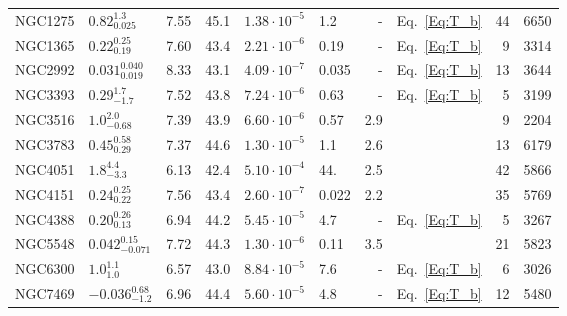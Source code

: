 \begin{footnotesize}
\begin{longtable}{llrrllrlrr}
NGC1275                &     $ 0.82_{0.025}^{1.3} $ &          7.55 &    45.1 & $1.38\cdot10^{-5}$ &          1.2 &        - &                    Eq.~\ref{Eq:T_b} &    44 &     6650 \\
NGC1365                &     $ 0.22_{0.19}^{0.25} $ &          7.60 &    43.4 & $2.21\cdot10^{-6}$ &         0.19 &        - &                    Eq.~\ref{Eq:T_b} &     9 &     3314 \\
NGC2992                &  $ 0.031_{0.019}^{0.040} $ &          8.33 &    43.1 & $4.09\cdot10^{-7}$ &        0.035 &        - &                    Eq.~\ref{Eq:T_b} &    13 &     3644 \\
NGC3393                &      $ 0.29_{-1.7}^{1.7} $ &          7.52 &    43.8 & $7.24\cdot10^{-6}$ &         0.63 &        - &                    Eq.~\ref{Eq:T_b} &     5 &     3199 \\
NGC3516                &      $ 1.0_{-0.68}^{2.0} $ &          7.39 &    43.9 & $6.60\cdot10^{-6}$ &         0.57 &      2.9 &            {\citet{summons_thesis}} &     9 &     2204 \\
NGC3783                &     $ 0.45_{0.29}^{0.58} $ &          7.37 &    44.6 & $1.30\cdot10^{-5}$ &          1.1 &      2.6 &            {\citet{summons_thesis}} &    13 &     6179 \\
NGC4051                &       $ 1.8_{-3.3}^{4.4} $ &          6.13 &    42.4 & $5.10\cdot10^{-4}$ &          44. &      2.5 &            {\citet{summons_thesis}} &    42 &     5866 \\
NGC4151                &     $ 0.24_{0.22}^{0.25} $ &          7.56 &    43.4 & $2.60\cdot10^{-7}$ &        0.022 &      2.2 &            {\citet{summons_thesis}} &    35 &     5769 \\
NGC4388                &     $ 0.20_{0.13}^{0.26} $ &          6.94 &    44.2 & $5.45\cdot10^{-5}$ &          4.7 &        - &                    Eq.~\ref{Eq:T_b} &     5 &     3267 \\
NGC5548                &  $ 0.042_{-0.071}^{0.15} $ &          7.72 &    44.3 & $1.30\cdot10^{-6}$ &         0.11 &      3.5 &            {\citet{summons_thesis}} &    21 &     5823 \\
NGC6300                &        $ 1.0_{1.0}^{1.1} $ &          6.57 &    43.0 & $8.84\cdot10^{-5}$ &          7.6 &        - &                    Eq.~\ref{Eq:T_b} &     6 &     3026 \\
NGC7469                &   $ -0.036_{-1.2}^{0.68} $ &          6.96 &    44.4 & $5.60\cdot10^{-5}$ &          4.8 &        - &                    Eq.~\ref{Eq:T_b} &    12 &     5480 \\

\end{longtable}
\end{footnotesize}
